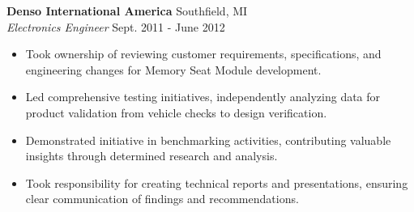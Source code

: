 \vspace{0.75em}

\noindent
\textbf{Denso International America} \hfill Southfield, MI \\
\textit{Electronics Engineer} \hfill Sept. 2011 - June 2012 \\
\begin{itemize}[leftmargin=*,noitemsep,topsep=3pt]
    \item Took ownership of reviewing customer requirements, specifications, and engineering changes for Memory Seat Module development.
    \item Led comprehensive testing initiatives, independently analyzing data for product validation from vehicle checks to design verification.
    \item Demonstrated initiative in benchmarking activities, contributing valuable insights through determined research and analysis.
    \item Took responsibility for creating technical reports and presentations, ensuring clear communication of findings and recommendations.
\end{itemize}
